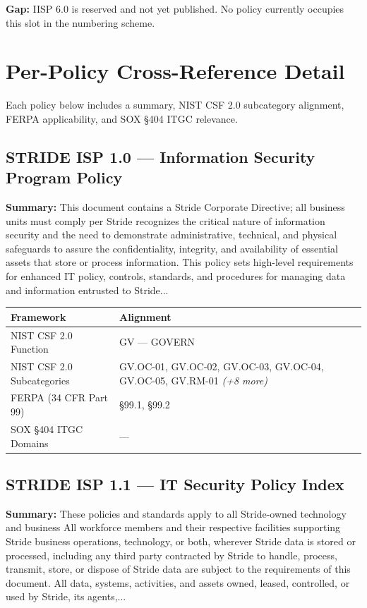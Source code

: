 \documentclass[11pt,landscape]{article}
\begin{document}
\textcolor{gapred}{\textbf{Gap:} IISP 6.0 is reserved and not yet published. No policy currently occupies this slot in the numbering scheme.}

\newpage

\section{Per-Policy Cross-Reference Detail}

Each policy below includes a summary, NIST CSF 2.0 subcategory alignment, FERPA applicability, and SOX §404 ITGC relevance.


\subsection{\textcolor{strideblue}{STRIDE ISP 1.0} --- Information Security Program Policy}
\label{pol:ISP10}

\textbf{Summary:} This document contains a Stride Corporate Directive; all business units must comply per Stride recognizes the critical nature of information security and the need to demonstrate administrative, technical, and physical safeguards to assure the confidentiality, integrity, and availability of essential assets that store or process information. This policy sets high-level requirements for enhanced IT policy, controls, standards, and procedures for managing data and information entrusted to Stride...

\begin{tabularx}{\textwidth}{|p{4cm}|X|}
\hline
\rowcolor{headgray} \textbf{Framework} & \textbf{Alignment} \\
\hline
NIST CSF 2.0 Function & GV --- GOVERN \\
\hline
NIST CSF 2.0 Subcategories & GV.OC-01, GV.OC-02, GV.OC-03, GV.OC-04, GV.OC-05, GV.RM-01 \textit{(+8 more)} \\
\hline
FERPA (34 CFR Part 99) & §99.1, §99.2 \\
\hline
SOX §404 ITGC Domains & --- \\
\hline
\end{tabularx}


\subsection{\textcolor{strideblue}{STRIDE ISP 1.1} --- IT Security Policy Index}
\label{pol:ISP11}

\textbf{Summary:} These policies and standards apply to all Stride-owned technology and business All workforce members and their respective facilities supporting Stride business operations, technology, or both, wherever Stride data is stored or processed, including any third party contracted by Stride to handle, process, transmit, store, or dispose of Stride data are subject to the requirements of this document. All data, systems, activities, and assets owned, leased, controlled, or used by Stride, its agents,...
\end{document}
